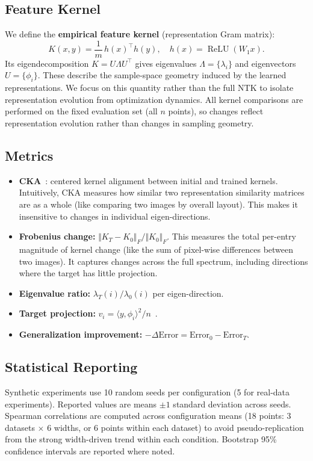 \documentclass[10pt]{article}
\newcommand{\DK}{{\Vert K_{T}-K_{0}\Vert_{F}/\Vert K_{0}\Vert_{F}}}
\begin{document}
\subsection{Feature Kernel}
We define the \textbf{empirical feature kernel} (representation Gram matrix):
\[
K(x,y)=\frac{1}{m}\,h(x)^{\top}h(y),\quad h(x)=\operatorname{ReLU}(W_{1}x).
\]
Its eigendecomposition $K=U\Lambda U^{\top}$ gives eigenvalues $\Lambda=\{\lambda_{i}\}$ and eigenvectors $U=\{\phi_{i}\}$. These describe the sample-space geometry induced by the learned representations.  We focus on this quantity rather than the full NTK to isolate representation evolution from optimization dynamics.  All kernel comparisons are performed on the fixed evaluation set (all $n$ points), so changes reflect representation evolution rather than changes in sampling geometry.

\subsection{Metrics}
\begin{itemize}
    \item \textbf{CKA}~\citep{kornblith2019similarity}: centered kernel alignment between initial and trained kernels. Intuitively, CKA measures how similar two representation similarity matrices are as a whole (like comparing two images by overall layout). This makes it insensitive to changes in individual eigen-directions.
    \item \textbf{Frobenius change:} $\DK$. This measures the total per-entry magnitude of kernel change (like the sum of pixel-wise differences between two images). It captures changes across the full spectrum, including directions where the target has little projection.
    \item \textbf{Eigenvalue ratio:} $\lambda_{T}(i)/\lambda_{0}(i)$ per eigen-direction.
    \item \textbf{Target projection:} $v_{i}=\langle y,\phi_{i}\rangle^{2}/n$~\citep{canatar2021spectral}.
    \item \textbf{Generalization improvement:} $-\Delta\text{Error}=\text{Error}_{0}-\text{Error}_{T}$.
\end{itemize}

\subsection{Statistical Reporting}
Synthetic experiments use 10 random seeds per configuration (5 for real-data experiments).  Reported values are means $\pm 1$ standard deviation across seeds.  Spearman correlations are computed across configuration means (18 points: 3 datasets $\times$ 6 widths, or 6 points within each dataset) to avoid pseudo-replication from the strong width-driven trend within each condition.  Bootstrap 95\% confidence intervals are reported where noted.
\end{document}
